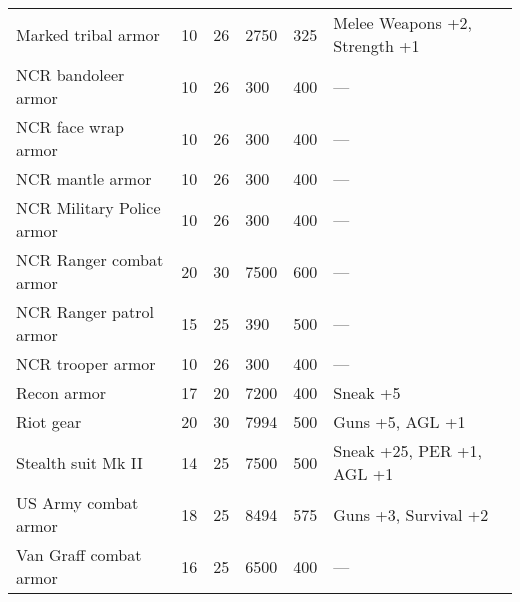 \documentclass{report}
\begin{document}
\begin{table}[H]
\begin{table}[H]
\begin{table}[H]
\begin{table}[H]
\begin{table}[H]
\begin{table}[H]
\begin{table}[H]
\begin{table}[H]
\begin{table}[H]
\begin{table}[H]
\begin{table}[H]
\begin{table}[H]
\begin{table}[H]
\begin{table}[H]
\begin{table}[H]
\begin{table}[H]
\begin{table}[H]
\begin{table}[H]
\begin{table}[H]
\begin{table}[H]
\begin{tabular}{p{30mm}p{30mm}p{30mm}p{30mm}p{30mm}p{30mm}}
Marked tribal armor  & 10 & 26 & 2750 & 325 & Melee Weapons +2, Strength +1  \\
NCR bandoleer armor  & 10 & 26 & 300 & 400 & —  \\
NCR face wrap armor  & 10 & 26 & 300 & 400 & —  \\
NCR mantle armor  & 10 & 26 & 300 & 400 & —  \\
NCR Military Police armor  & 10 & 26 & 300 & 400 & —  \\
NCR Ranger combat armor  & 20 & 30 & 7500 & 600 & —  \\
NCR Ranger patrol armor  & 15 & 25 & 390 & 500 & —  \\
NCR trooper armor  & 10 & 26 & 300 & 400 & —  \\
Recon armor  & 17 & 20 & 7200 & 400 & Sneak +5  \\
Riot gear  & 20 & 30 & 7994 & 500 & Guns +5, AGL +1  \\
Stealth suit Mk II  & 14 & 25 & 7500 & 500 & Sneak +25, PER +1, AGL +1 \\
US Army combat armor  & 18 & 25 & 8494 & 575 & Guns +3, Survival +2  \\
Van Graff combat armor  & 16 & 25 & 6500 & 400 & —  \\
  \end{tabular}

\end{table}
\end{table}
\end{table}
\end{table}
\end{table}
\end{table}
\end{table}
\end{table}
\end{table}
\end{table}
\end{table}
\end{table}
\end{table}
\end{table}
\end{table}
\end{table}
\end{table}
\end{table}
\end{table}
\end{table}
\end{document}

